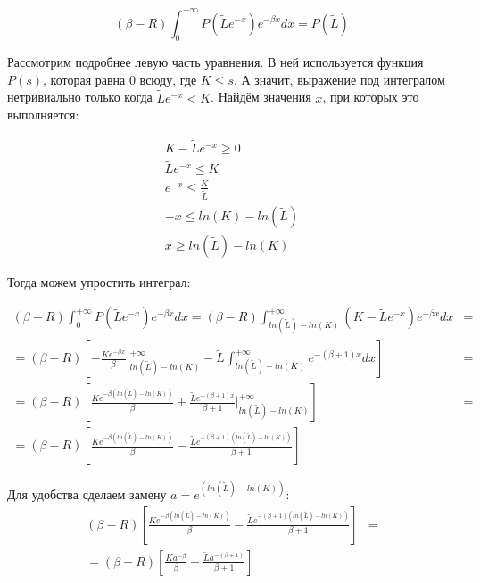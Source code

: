 \documentclass[a4paper,12pt]{article}
\theoremstyle{definition}
\begin{document}
\begin{equation*}
    (\beta - R) \int_{0}^{+\infty} P(\tilde{L} e^{-x}) e^{-\beta x} dx = P(\tilde{L})
\end{equation*}

Рассмотрим подробнее левую часть уравнения. В ней используется функция $P(s)$, которая равна 0 всюду, где $K \le s$. А значит, выражение под интегралом нетривиально только когда $\tilde{L} e^{-x} < K$. Найдём значения $x$, при которых это выполняется:

\begin{gather*} 
K - \tilde{L} e^{-x} \ge 0 \\ 
\tilde{L} e^{-x} \le K \\
e^{-x} \le \frac{K}{\tilde{L}} \\
-x \le ln(K) - ln(\tilde{L}) \\
x \ge ln(\tilde{L}) - ln(K)
\end{gather*}

Тогда можем упростить интеграл:

\begin{equation*}
\begin{split}
    (\beta - R) \int_{0}^{+\infty} P(\tilde{L} e^{-x}) e^{-\beta x} dx = (\beta - R) \int_{ln(\tilde{L}) - ln(K)}^{+\infty} (K - \tilde{L} e^{-x}) e^{-\beta x} dx &= \\
    = (\beta - R) \left[ - \frac{K e^{-\beta x}}{\beta} \bigg|_{ln(\tilde{L}) - ln(K)}^{+\infty} - \tilde{L} \int_{ln(\tilde{L}) - ln(K)}^{+\infty} e^{-(\beta + 1) x} dx \right] &= \\
    = (\beta - R) \left[ \frac{K e^{-\beta (ln(\tilde{L}) - ln(K))}}{\beta} + \frac{\tilde{L} e^{-(\beta + 1) x}}{\beta + 1} \bigg|_{ln(\tilde{L}) - ln(K)}^{+\infty} \right] &= \\
    = (\beta - R) \left[ \frac{K e^{-\beta (ln(\tilde{L}) - ln(K))}}{\beta} - \frac{\tilde{L} e^{-(\beta + 1) (ln(\tilde{L}) - ln(K))}}{\beta + 1} \right] %
\end{split}
\end{equation*}

Для удобства сделаем замену $a = e^{(ln(\tilde{L}) - ln(K))}$:
\begin{equation*}
    \begin{split}
        (\beta - R) \left[ \frac{K e^{-\beta (ln(\tilde{L}) - ln(K))}}{\beta} - \frac{\tilde{L} e^{-(\beta + 1) (ln(\tilde{L}) - ln(K))}}{\beta + 1} \right] &= \\
        = (\beta - R) \left[ \frac{K a^{-\beta}}{\beta} - \frac{\tilde{L} a^{-(\beta + 1)}}{\beta + 1} \right]
    \end{split}
\end{equation*}
\end{document}
